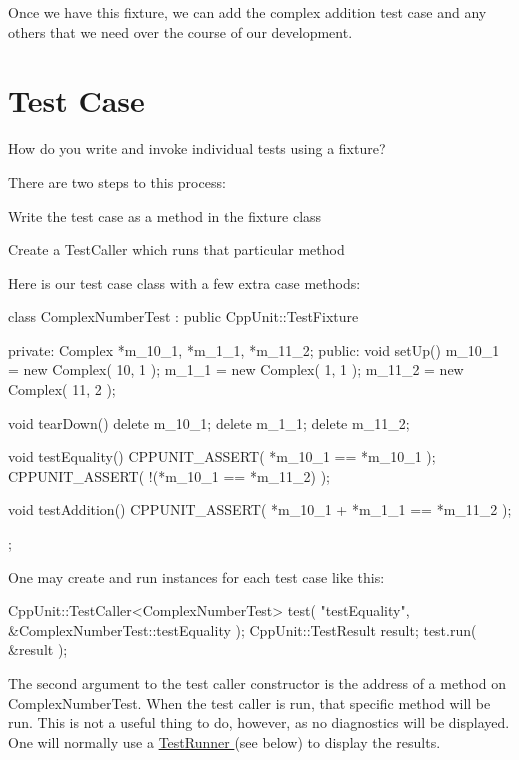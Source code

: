 Once we have this fixture, we can add the complex addition test case and any others that we need over the course of our development.\hypertarget{cppunit_cookbook_test_case}{}\section{Test Case}\label{cppunit_cookbook_test_case}
How do you write and invoke individual tests using a fixture?

There are two steps to this process:
\begin{DoxyItemize}
\item Write the test case as a method in the fixture class
\item Create a TestCaller which runs that particular method
\end{DoxyItemize}

Here is our test case class with a few extra case methods:


\begin{DoxyCode}
class ComplexNumberTest : public CppUnit::TestFixture  {
private:
  Complex *m_10_1, *m_1_1, *m_11_2;
public:
  void setUp()
  {
    m_10_1 = new Complex( 10, 1 );
    m_1_1 = new Complex( 1, 1 );
    m_11_2 = new Complex( 11, 2 );  
  }

  void tearDown() 
  {
    delete m_10_1;
    delete m_1_1;
    delete m_11_2;
  }

  void testEquality()
  {
    CPPUNIT_ASSERT( *m_10_1 == *m_10_1 );
    CPPUNIT_ASSERT( !(*m_10_1 == *m_11_2) );
  }

  void testAddition()
  {
    CPPUNIT_ASSERT( *m_10_1 + *m_1_1 == *m_11_2 );
  }
};
\end{DoxyCode}


One may create and run instances for each test case like this:


\begin{DoxyCode}
CppUnit::TestCaller<ComplexNumberTest> test( "testEquality", 
                                             &ComplexNumberTest::testEquality );
CppUnit::TestResult result;
test.run( &result );
\end{DoxyCode}


The second argument to the test caller constructor is the address of a method on ComplexNumberTest. When the test caller is run, that specific method will be run. This is not a useful thing to do, however, as no diagnostics will be displayed. One will normally use a \hyperlink{group___executing_test}{TestRunner } (see below) to display the results.

